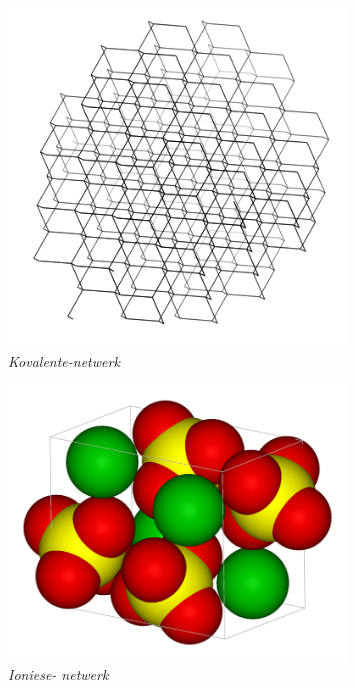 \begin{figure}[H]
  \begin{center}
  \begin{minipage}[c]{5 cm}
    \includegraphics[width=0.8\textwidth]{photos/Diamond_Carbon.png} \\
    \textsl{Kovalente-netwerk}
  \end{minipage}
  \begin{minipage}[c]{5 cm}
    \includegraphics[width=0.8\textwidth]{photos/BaSO4_wikipedia.png}  \\ 
    \textsl{Ioniese- netwerk}
  \end{minipage}
  \begin{minipage}[c]{5 cm}

\end{minipage}
\end{center}
\end{figure}
